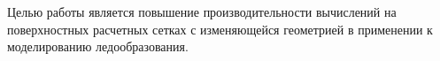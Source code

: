 Целью работы является повышение производительности вычислений на поверхностных расчетных сетках с изменяющейся геометрией в применении к моделированию ледообразования.